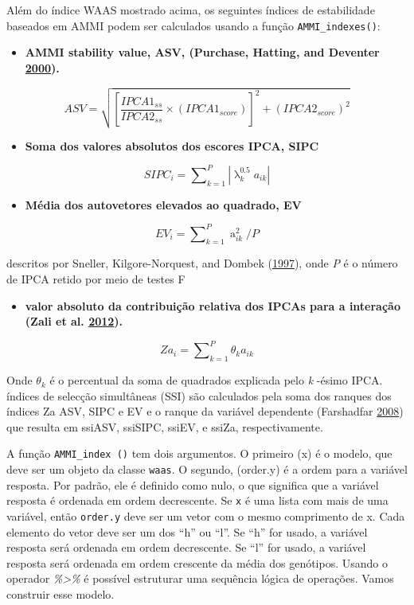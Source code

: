 \documentclass[
]{book}
\providecommand{\tightlist}{%
  \setlength{\itemsep}{0pt}\setlength{\parskip}{0pt}}
\numberwithin{equation}{section}
\begin{document}
Além do índice WAAS mostrado acima, os seguintes índices de estabilidade baseados em AMMI podem ser calculados usando a função \texttt{AMMI\_indexes()}:

\begin{itemize}
\tightlist
\item
  \textbf{AMMI stability value, ASV, (Purchase, Hatting, and Deventer \protect\hyperlink{ref-Purchase2000}{2000}).}
\end{itemize}

\[
ASV = \sqrt {{{\left[ {\frac{{IPCA{1_{ss}}}}{{IPCA{2_{ss}}}} \times \left( {IPCA{1_{score}}} \right)} \right]}^2} + {{\left( {IPCA{2_{score}}} \right)}^2}}
\]

\begin{itemize}
\tightlist
\item
  \textbf{Soma dos valores absolutos dos escores IPCA, SIPC}
\end{itemize}

\[
SIP{C_i} = \sum\nolimits_{k = 1}^P {\left| {\mathop {\lambda }\nolimits_k^{0.5} {a_{ik}}} \right|}
\]

\begin{itemize}
\tightlist
\item
  \textbf{Média dos autovetores elevados ao quadrado, EV}
\end{itemize}

\[
E{V_i} = \sum\nolimits_{k = 1}^P {\mathop a\nolimits_{ik}^2 } /P
\]

descritos por Sneller, Kilgore-Norquest, and Dombek (\protect\hyperlink{ref-Sneller1997}{1997}), onde \emph{P} é o número de IPCA retido por meio de testes F

\begin{itemize}
\tightlist
\item
  \textbf{valor absoluto da contribuição relativa dos IPCAs para a interação (Zali et al. \protect\hyperlink{ref-Zali2012}{2012}).}
\end{itemize}

\[
Z{a_i} = \sum\nolimits_{k = 1}^P {{\theta _k}{a_{ik}}}
\]

Onde \({\theta _k}\) é o percentual da soma de quadrados explicada pelo \emph{k} -ésimo IPCA. índices de selecção simultâneas (SSI) são calculados pela soma dos ranques dos índices Za ASV, SIPC e EV e o ranque da variável dependente (Farshadfar \protect\hyperlink{ref-Farshadfar2008}{2008}) que resulta em ssiASV, ssiSIPC, ssiEV, e ssiZa, respectivamente.

A função \texttt{AMMI\_index\ ()} tem dois argumentos. O primeiro (x) é o modelo, que deve ser um objeto da classe \texttt{waas}. O segundo, (order.y) é a ordem para a variável resposta. Por padrão, ele é definido como nulo, o que significa que a variável resposta é ordenada em ordem decrescente. Se \texttt{x} é uma lista com mais de uma variável, então \texttt{order.y} deve ser um vetor com o mesmo comprimento de x. Cada elemento do vetor deve ser um dos ``h'' ou ``l''. Se ``h'' for usado, a variável resposta será ordenada em ordem decrescente. Se ``l'' for usado, a variável resposta será ordenada em ordem crescente da média dos genótipos. Usando o operador \emph{\%\textgreater\% } é possível estruturar uma sequência lógica de operações. Vamos construir esse modelo.
\end{document}
